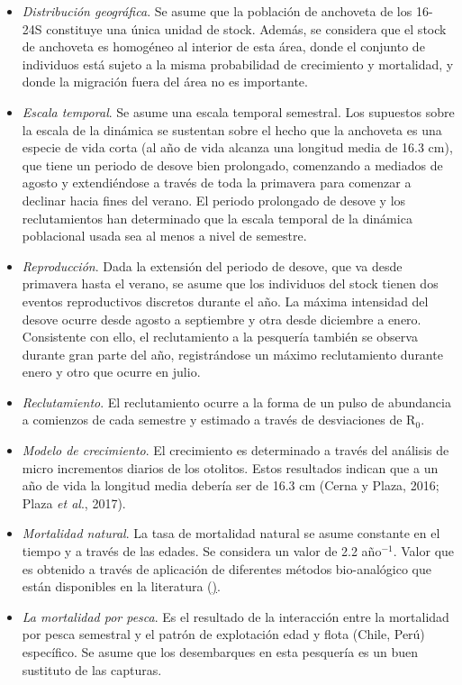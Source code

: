 \documentclass[letter,11pt]{article}
\begin{document}
\begin{itemize}
\item
  \textit{Distribuci\'on geogr\'afica}. Se asume que la poblaci\'on de
  anchoveta de los 16\degree - 24\degree S constituye una \'unica unidad de stock.
  Adem\'as, se considera que el stock de anchoveta es homog\'eneo al
  interior de esta \'area, donde el conjunto de individuos est\'a sujeto a
  la misma probabilidad de crecimiento y mortalidad, y donde la
  migraci\'on fuera del \'area no es importante.
\item
  \textit{Escala temporal}. Se asume una escala temporal semestral. Los
  supuestos sobre la escala de la din\'amica se sustentan sobre el hecho
  que la anchoveta es una especie de vida corta (al a\~{n}o de vida alcanza
  una longitud media de 16.3 cm), que tiene un periodo de desove bien
  prolongado, comenzando a mediados de agosto y extendi\'endose a trav\'es
  de toda la primavera para comenzar a declinar hacia fines del verano.
  El periodo prolongado de desove y los reclutamientos han determinado
  que la escala temporal de la din\'amica poblacional usada sea al menos a
  nivel de semestre.
\item
  \textit{Reproducci\'on}. Dada la extensi\'on del periodo de desove, que va
  desde primavera hasta el verano, se asume que los individuos del stock
  tienen dos eventos reproductivos discretos durante el a\~{n}o. La m\'axima
  intensidad del desove ocurre desde agosto a septiembre y otra desde
  diciembre a enero. Consistente con ello, el reclutamiento a la
  pesquer\'ia tambi\'en se observa durante gran parte del a\~{n}o, registr\'andose
  un m\'aximo reclutamiento durante enero y otro que ocurre en julio.
\item
  \textit{Reclutamiento}. El reclutamiento ocurre a la forma de un pulso
  de abundancia a comienzos de cada semestre y estimado a trav\'es de
  desviaciones de R$_{0}$.
\item
  \textit{Modelo de crecimiento}. El crecimiento es determinado a trav\'es
  del an\'alisis de micro incrementos diarios de los otolitos. Estos
  resultados indican que a un a\~{n}o de vida la longitud media deber\'ia ser
  de 16.3 cm (Cerna y Plaza, 2016; Plaza \textit{et al}., 2017).
\item
  \textit{Mortalidad natural}. La tasa de mortalidad natural se asume
  constante en el tiempo y a trav\'es de las edades. Se considera un valor
  de 2.2 a\~{n}o$^{-1}$. Valor que es obtenido a trav\'es de aplicaci\'on de
  diferentes m\'etodos bio-anal\'ogico que est\'an disponibles en la
  literatura (\href{http://barefootecologist.com.au/shiny_m.html}).
\item
  \textit{La mortalidad por pesca}. Es el resultado de la interacci\'on
  entre la mortalidad por pesca semestral y el patr\'on de explotaci\'on
  edad y flota (Chile, Per\'u) espec\'ifico. Se asume que los desembarques
  en esta pesquer\'ia es un buen sustituto de las capturas.
\end{itemize}
\end{document}
